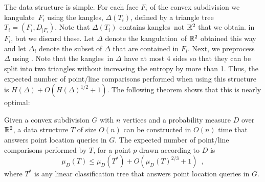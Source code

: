 \documentclass[charterfonts,lotsofwhite]{patmorin}
\newcommand{\kangles}{kangles}
\newcommand{\kangulation}{kangulation}
\newcommand{\kangulate}{kangulate}
\begin{document}
The data structure is simple.  For each face $F_i$ of the convex
subdivision we \kangulate\ $F_i$ using the \kangles, $\Delta(T_i)$,
defined by a triangle tree $T_i=(F_i,D_{|F_i})$.  Note that
$\Delta(T_i)$ contains \kangles\ not $\mathbb{R}^2$ that we obtain.  in $F_i$,
but we discard these.  Let $\Delta$ denote the \kangulation\ of $\mathbb{R}^2$
obtained this way and let $\Delta_i$ denote the subset of $\Delta$
that are contained in $F_i$.  Next, we preprocess $\Delta$ using
.  Note that the \kangles\ in $\Delta$ have at most 4
sides so that they can be split into two triangles without increasing
the entropy by more than 1. Thus, the expected number of point/line
comparisons performed when using this structure is $H(\Delta) +
O(H(\Delta)^{1/2} + 1)$.  The following theorem shows that this is
nearly optimal:

\begin{thm}
Given a convex subdivision $G$ with $n$ vertices and a probability
measure $D$ over $\mathbb{R}^2$, a data structure $T$ of size $O(n)$ can be
constructed in $O(n)$ time that answers point location queries in $G$.
The expected number of point/line comparisons performed by $T$, 
for a point $p$ drawn according to $D$ is 
\[
  \mu_D(T) \le \mu_D(T^*) + O(\mu_D(T)^{2/3}+1) \enspace , 
\] 
where $T^*$ is any linear classification tree that answers point
location queries in $G$.
\end{thm}
\end{document}

